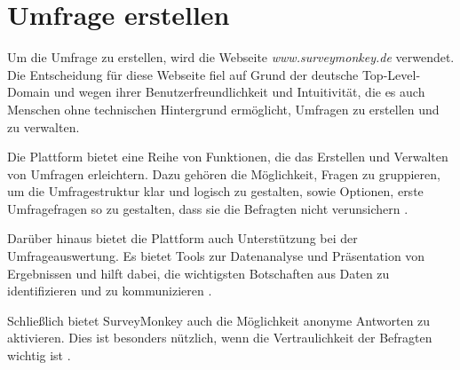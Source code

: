 \section{Umfrage erstellen}
Um die Umfrage zu erstellen, wird die Webseite \emph{www.surveymonkey.de} verwendet. Die Entscheidung für diese Webseite fiel auf Grund der deutsche Top-Level-Domain und wegen ihrer Benutzerfreundlichkeit und Intuitivität, die es auch Menschen ohne technischen Hintergrund ermöglicht, Umfragen zu erstellen und zu verwalten\cite{surveymonkey-create-surveys}.

Die Plattform bietet eine Reihe von Funktionen, die das Erstellen und Verwalten von Umfragen erleichtern. Dazu gehören die Möglichkeit, Fragen zu gruppieren, um die Umfragestruktur klar und logisch zu gestalten, sowie Optionen, erste Umfragefragen so zu gestalten, dass sie die Befragten nicht verunsichern \cite{surveymonkey-create-surveys}.

Darüber hinaus bietet die Plattform auch Unterstützung bei der Umfrageauswertung. Es bietet Tools zur Datenanalyse und Präsentation von Ergebnissen und hilft dabei, die wichtigsten Botschaften aus Daten zu identifizieren und zu kommunizieren \cite{surveymonkey-auswertung-einer-umfrage}.

Schließlich bietet SurveyMonkey auch die Möglichkeit anonyme Antworten zu aktivieren. Dies ist besonders nützlich, wenn die Vertraulichkeit der Befragten wichtig ist \cite{surveymonkey-anonymous-responses}.


